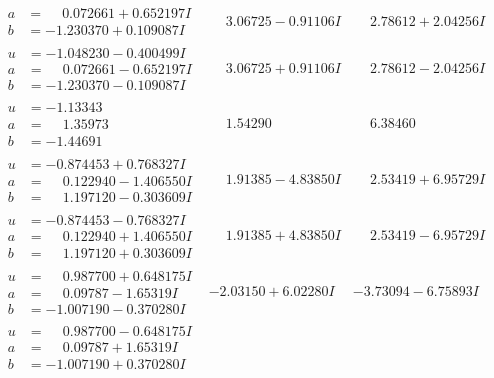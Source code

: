 \documentclass[1p]{elsarticle_modified}
\theoremstyle{definition}
\begin{document}
$$\begin{array}{c|c|c}
\begin{aligned}
a &= \phantom{-}0.072661 + 0.652197 I \\
b &= -1.230370 + 0.109087 I\end{aligned}
 & \phantom{-}3.06725 - 0.91106 I & \phantom{-}2.78612 + 2.04256 I \\ \hline\begin{aligned}
u &= -1.048230 - 0.400499 I \\
a &= \phantom{-}0.072661 - 0.652197 I \\
b &= -1.230370 - 0.109087 I\end{aligned}
 & \phantom{-}3.06725 + 0.91106 I & \phantom{-}2.78612 - 2.04256 I \\ \hline\begin{aligned}
u &= -1.13343\phantom{ +0.000000I} \\
a &= \phantom{-}1.35973\phantom{ +0.000000I} \\
b &= -1.44691\phantom{ +0.000000I}\end{aligned}
 & \phantom{-}1.54290\phantom{ +0.000000I} & \phantom{-}6.38460\phantom{ +0.000000I} \\ \hline\begin{aligned}
u &= -0.874453 + 0.768327 I \\
a &= \phantom{-}0.122940 - 1.406550 I \\
b &= \phantom{-}1.197120 - 0.303609 I\end{aligned}
 & \phantom{-}1.91385 - 4.83850 I & \phantom{-}2.53419 + 6.95729 I \\ \hline\begin{aligned}
u &= -0.874453 - 0.768327 I \\
a &= \phantom{-}0.122940 + 1.406550 I \\
b &= \phantom{-}1.197120 + 0.303609 I\end{aligned}
 & \phantom{-}1.91385 + 4.83850 I & \phantom{-}2.53419 - 6.95729 I \\ \hline\begin{aligned}
u &= \phantom{-}0.987700 + 0.648175 I \\
a &= \phantom{-}0.09787 - 1.65319 I \\
b &= -1.007190 - 0.370280 I\end{aligned}
 & -2.03150 + 6.02280 I & -3.73094 - 6.75893 I \\ \hline\begin{aligned}
u &= \phantom{-}0.987700 - 0.648175 I \\
a &= \phantom{-}0.09787 + 1.65319 I \\
b &= -1.007190 + 0.370280 I\end{aligned}

\end{array}$$
\end{document}
